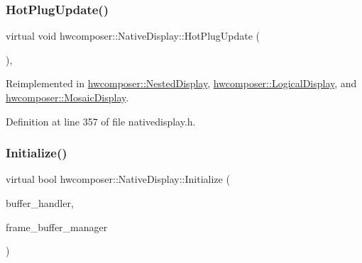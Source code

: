 \mbox{\label{classhwcomposer_1_1NativeDisplay_a30e5c044e3a84ed23d2b3a5cec3f9037}} 
\subsubsection{\texorpdfstring{Hot\+Plug\+Update()}{HotPlugUpdate()}}
{\footnotesize\ttfamily virtual void hwcomposer\+::\+Native\+Display\+::\+Hot\+Plug\+Update (\begin{DoxyParamCaption}\item[{bool}]{ }\end{DoxyParamCaption})\hspace{0.3cm}{\ttfamily [inline]}, {\ttfamily [virtual]}}



Reimplemented in \mbox{\hyperlink{classhwcomposer_1_1NestedDisplay_a1da3837cf3cb8fd5f3f2e9bdd7b339ff}{hwcomposer\+::\+Nested\+Display}}, \mbox{\hyperlink{classhwcomposer_1_1LogicalDisplay_ab216be63c504dc281fa1da2f7825e059}{hwcomposer\+::\+Logical\+Display}}, and \mbox{\hyperlink{classhwcomposer_1_1MosaicDisplay_af529c96ce14e717b11759fa45648ea68}{hwcomposer\+::\+Mosaic\+Display}}.



Definition at line 357 of file nativedisplay.\+h.


\begin{DoxyCode}{0}
\end{DoxyCode}
\mbox{\label{classhwcomposer_1_1NativeDisplay_a008eb015dda9b4ead93186b4897c2e3c}} 
\subsubsection{\texorpdfstring{Initialize()}{Initialize()}}
{\footnotesize\ttfamily virtual bool hwcomposer\+::\+Native\+Display\+::\+Initialize (\begin{DoxyParamCaption}\item[{\mbox{\hyperlink{classhwcomposer_1_1NativeBufferHandler}{Native\+Buffer\+Handler}} $\ast$}]{buffer\+\_\+handler,  }\item[{\mbox{\hyperlink{classhwcomposer_1_1FrameBufferManager}{Frame\+Buffer\+Manager}} $\ast$}]{frame\+\_\+buffer\+\_\+manager }\end{DoxyParamCaption})\hspace{0.3cm}{\ttfamily [pure virtual]}}



